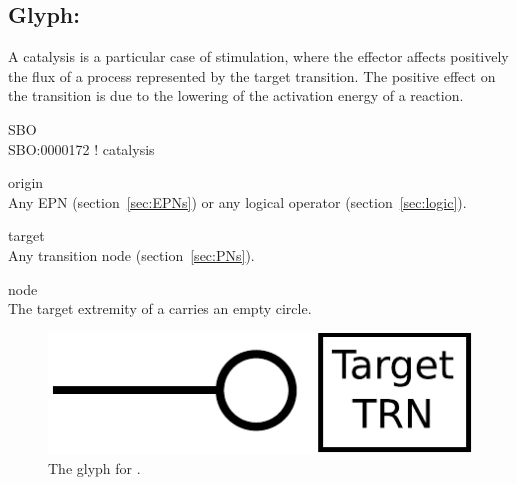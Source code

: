 \subsection{Glyph: }\label{sec:catalysis}

A catalysis is a particular case of stimulation, where the effector affects
positively the flux of a process represented by the target transition. The positive effect on the transition is due to the lowering of the activation energy of a reaction.

\begin{glyphDescription}
 \item[SBO]\mbox{}\\ SBO:0000172 ! catalysis
 \item[origin]\mbox{}\\ Any EPN (section~\ref{sec:EPNs}) or any logical operator (section~\ref{sec:logic}).
 \item[target]\mbox{}\\ Any transition node (section~\ref{sec:PNs}).
 \item[node]\mbox{}\\ The target extremity of a  carries an empty circle.
 \end{glyphDescription}

\begin{figure}[H]
  \centering
  \includegraphics[scale = 0.5]{images/catalysis}
  \caption{The \PD glyph for .}
  \label{fig:catalysis}
\end{figure}



